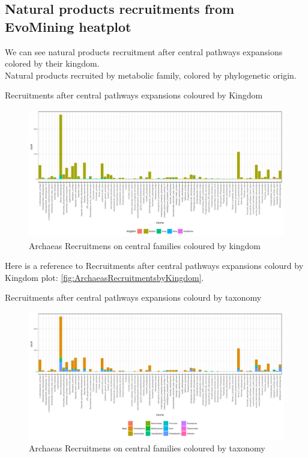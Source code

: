 \documentclass[12pt,twoside]{reedthesis}
\begin{document}
  \subsection{Natural products recruitments from EvoMining
  heatplot}\label{natural-products-recruitments-from-evomining-heatplot}
  
  We can see natural products recruitment after central pathways
  expansions colored by their kingdom.\\
  Natural products recruited by metabolic family, colored by phylogenetic
  origin.
  
  Recruitments after central pathways expansions coloured by Kingdom
  
  \begin{figure}[h!tbp]
  \centering
  \includegraphics[angle = 0,scale = 0.6]{chapter3/ArchaeasRecruitmentsbyKingdom.pdf}
  \caption[Archaeas Recruitmens on central families coloured by kingdom]{\normalsize{Archaeas Recruitmens on central families coloured by kingdom}}
  \label{fig:ArchaeasRecruitmentsbyKingdom}
  \end{figure}
  
  Here is a reference to Recruitments after central pathways expansions
  colourd by Kingdom plot: \autoref{fig:ArchaeasRecruitmentsbyKingdom}.
  
  \clearpage 
  Recruitments after central pathways expansions colourd by taxonomy
  
  \begin{figure}[h!tbp]
  \centering
  \includegraphics[angle = 0,scale = 0.5]{chapter3/ArchaeasRecruitmentsbyTaxa.pdf}
  \caption[Archaeas Recruitmens on central families coloured by taxonomy]{\normalsize{Archaeas Recruitmens on central families coloured by taxonomy}}
  \label{fig:ArchaeasRecruitmentsbyTaxa}
  \end{figure}
  
\end{document}
